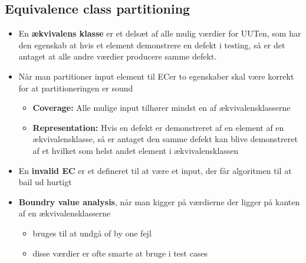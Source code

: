 \documentclass[a4, english]{article}
\begin{document}
\subsection{Equivalence class partitioning}
\begin{itemize}
	\item En \textbf{ækvivalens klasse} er et delsæt af alle mulig værdier for UUTen, som har den egenskab at hvis et element demonstrere en defekt i testing, så er det antaget at alle andre værdier producere samme defekt. 
  \item Når man partitioner input element til ECer to egenskaber skal være korrekt for at partitioneringen er sound
  \begin{itemize}
  	\item \textbf{Coverage:} Alle mulige input tilhører mindst en af ækvivalensklasserne 
    \item \textbf{Representation:} Hvis en defekt er demonstreret af en element af en ækvivalensklasse, så er antaget den samme defekt kan blive demonstreret af et hvilket som helst andet element i ækvivalensklassen 
  \end{itemize}
  \item En \textbf{invalid EC} er et defineret til at være et input, der får algoritmen til at bail ud hurtigt 
  \item \textbf{Boundry value analysis}, når man kigger på værdierne der ligger på kanten af en ækvivalensklasserne
  \begin{itemize}
  	\item bruges til at undgå of by one fejl
    \item disse værdier er ofte smarte at bruge i test cases
  \end{itemize}
\end{itemize}
\end{document}
